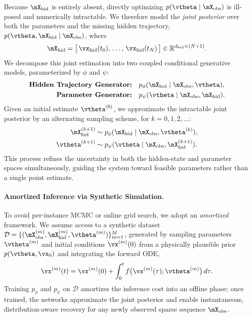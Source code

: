 Because $\mX_{\mathrm{hid}}$ is entirely absent, directly optimizing
$p(\vtheta \mid \mX_{\mathrm{obs}})$ is ill-posed and numerically intractable. We therefore model
the \textit{joint posterior} over both the parameters and the missing hidden trajectory,
$p(\vtheta, \mX_{\mathrm{hid}} \mid \mX_{\mathrm{obs}})$, where
\begin{equation}
    \mX_{\mathrm{hid}} = \big[\, \vx_{\mathrm{hid}}(t_0),\, \dots,\, \vx_{\mathrm{hid}}(t_N) \,\big]
    \in \mathbb{R}^{d_{\mathrm{hid}} \times (N+1)}.
\end{equation}
We decompose this joint estimation into two coupled conditional generative models, parameterized by
$\phi$ and $\psi$:
\begin{align}
    \text{\textbf{Hidden Trajectory Generator:}} \quad & p_\phi(\mX_{\mathrm{hid}} \mid \mX_{\mathrm{obs}}, \vtheta), \\
    \text{\textbf{Parameter Generator:}} \quad & p_\psi(\vtheta \mid \mX_{\mathrm{obs}}, \mX_{\mathrm{hid}}).
\end{align}
Given an initial estimate $\vtheta^{(0)}$, we approximate the intractable joint posterior by an
alternating sampling scheme, for $k = 0, 1, 2, \dots$:
\begin{align}
    \mX_{\mathrm{hid}}^{(k+1)} & \sim p_\phi(\mX_{\mathrm{hid}} \mid \mX_{\mathrm{obs}}, \vtheta^{(k)}), \label{eq:update_x} \\
    \vtheta^{(k+1)} & \sim p_\psi(\vtheta \mid \mX_{\mathrm{obs}}, \mX_{\mathrm{hid}}^{(k+1)}). \label{eq:update_theta}
\end{align}
This process refines the uncertainty in both the hidden-state and parameter spaces simultaneously,
guiding the system toward feasible parameters rather than a single point estimate.

\paragraph{Amortized Inference via Synthetic Simulation.}
To avoid per-instance MCMC or online grid search, we adopt an \textit{amortized} framework. We
assume access to a synthetic dataset
$\mathcal{D} = \{ (\mX_{\mathrm{obs}}^{(m)}, \mX_{\mathrm{hid}}^{(m)}, \vtheta^{(m)}) \}_{m=1}^{M}$,
generated by sampling parameters $\vtheta^{(m)}$ and initial conditions $\vx^{(m)}(0)$ from a
physically plausible prior $p(\vtheta, \vx_0)$ and integrating the forward ODE,
\begin{equation}
    \vx^{(m)}(t) = \vx^{(m)}(0) + \int_{0}^{t} f\big(\vx^{(m)}(\tau); \vtheta^{(m)}\big)\, d\tau.
\end{equation}
Training $p_\phi$ and $p_\psi$ on $\mathcal{D}$ amortizes the inference cost into an offline phase;
once trained, the networks approximate the joint posterior and enable instantaneous,
distribution-aware recovery for any newly observed sparse sequence $\mX_{\mathrm{obs}}$.
